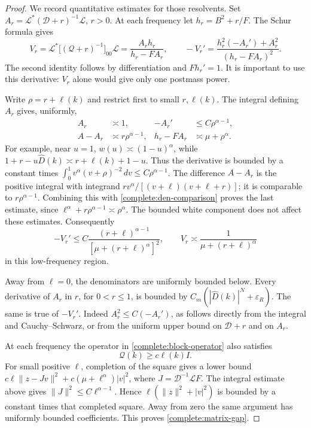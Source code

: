 \documentclass[11pt]{article}
\begin{document}
\begin{proof}
We record quantitative estimates for those resolvents. Set
\(A_r=\mathcal L^*(\mathcal D+r)^{-1}\mathcal L\), \(r>0\).
At each frequency let \(h_r=B^2+r/F\). The Schur formula gives
\begin{equation}\label{complete:resolvent-compression}
 V_r=\mathcal L^*\bigl[(\mathcal Q+r)^{-1}\bigr]_{00}\mathcal L
       =\frac{A_rh_r}{h_r-F A_r},\qquad
 -V_r'=\frac{h_r^2(-A_r')+A_r^2}{(h_r-F A_r)^2}.
\end{equation}
The second identity follows by differentiation and \(Fh_r'=1\).
It is important to use this derivative: \(V_r\) alone would give
only one postmass power.

Write \(\rho=r+\ell(k)\) and restrict first to small \(r,\ell(k)\).
The integral defining \(A_r\) gives, uniformly,
\begin{align}
 A_r&\asymp1, &
 -A_r'&\le C\rho^{\alpha-1},\nonumber\\
 A-A_r&\asymp r\rho^{\alpha-1}, &
 h_r-F A_r&\asymp\mu+\rho^\alpha.
 \label{complete:resolvent-estimates}
\end{align}
For example, near \(u=1\), \(w(u)\asymp(1-u)^\alpha\), while
\(1+r-u\widehat D(k)\asymp r+\ell(k)+1-u\).
Thus the derivative is bounded by a constant times
\(\int_0^1v^\alpha(v+\rho)^{-2}\,dv\le C\rho^{\alpha-1}\).
The difference \(A-A_r\) is the positive integral with integrand
\(r v^\alpha/[(v+\ell)(v+\ell+r)]\); it is comparable to
\(r\rho^{\alpha-1}\). Combining this with
\eqref{complete:den-comparison} proves the last estimate, since
\(\ell^\alpha+r\rho^{\alpha-1}\asymp\rho^\alpha\).
The bounded white component does not affect these estimates.
Consequently
\begin{equation}\label{complete:V-derivative}
 -V_r'\le C\frac{(r+\ell)^{\alpha-1}}
                         {[\mu+(r+\ell)^\alpha]^2},
 \qquad V_r\asymp\frac1{\mu+(r+\ell)^\alpha}
\end{equation}
in this low-frequency region.

Away from \(\ell=0\), the denominators are uniformly bounded below.
Every derivative of \(A_r\) in \(r\), for \(0<r\le1\), is bounded
by \(C_m(|\widehat D(k)|^N+\varepsilon_R)\). The same is true
of \(-V_r'\). Indeed \(A_r^2\le C(-A_r')\), as follows directly
from the integral and Cauchy--Schwarz, or from the uniform upper
bound on \(\mathcal D+r\) and on \(A_r\).

At each frequency the operator in \eqref{complete:block-operator}
also satisfies
\begin{equation}\label{complete:matrix-gap}
 \mathcal Q(k)\ge c\ell(k)I.
\end{equation}
For small positive \(\ell\), completion of the square gives a lower
bound
\(c\ell\|z-Jv\|^2+c(\mu+\ell^\alpha)|v|^2\), where
\(J=\mathcal D^{-1}\mathcal L F\).
The integral estimate above gives \(\|J\|^2\le C\ell^{\alpha-1}\).
Hence \(\ell(\|z\|^2+|v|^2)\) is bounded by a constant times that
completed square. Away from zero the same argument has uniformly
bounded coefficients. This proves \eqref{complete:matrix-gap}.


\end{proof}
\end{document}
